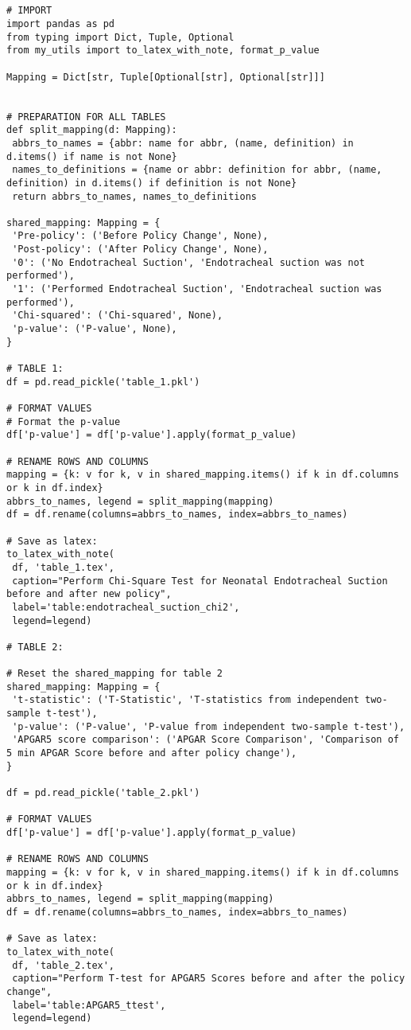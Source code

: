 \documentclass[11pt]{article}
\begin{document}
\begin{verbatim}


# IMPORT
import pandas as pd
from typing import Dict, Tuple, Optional
from my_utils import to_latex_with_note, format_p_value

Mapping = Dict[str, Tuple[Optional[str], Optional[str]]]


# PREPARATION FOR ALL TABLES
def split_mapping(d: Mapping):
 abbrs_to_names = {abbr: name for abbr, (name, definition) in d.items() if name is not None}
 names_to_definitions = {name or abbr: definition for abbr, (name, definition) in d.items() if definition is not None}
 return abbrs_to_names, names_to_definitions

shared_mapping: Mapping = {
 'Pre-policy': ('Before Policy Change', None),
 'Post-policy': ('After Policy Change', None),
 '0': ('No Endotracheal Suction', 'Endotracheal suction was not performed'),
 '1': ('Performed Endotracheal Suction', 'Endotracheal suction was performed'),
 'Chi-squared': ('Chi-squared', None),
 'p-value': ('P-value', None),
}

# TABLE 1:
df = pd.read_pickle('table_1.pkl')

# FORMAT VALUES
# Format the p-value
df['p-value'] = df['p-value'].apply(format_p_value)

# RENAME ROWS AND COLUMNS
mapping = {k: v for k, v in shared_mapping.items() if k in df.columns or k in df.index}
abbrs_to_names, legend = split_mapping(mapping)
df = df.rename(columns=abbrs_to_names, index=abbrs_to_names)

# Save as latex:
to_latex_with_note(
 df, 'table_1.tex',
 caption="Perform Chi-Square Test for Neonatal Endotracheal Suction before and after new policy", 
 label='table:endotracheal_suction_chi2',
 legend=legend)

# TABLE 2:

# Reset the shared_mapping for table 2
shared_mapping: Mapping = {
 't-statistic': ('T-Statistic', 'T-statistics from independent two-sample t-test'),
 'p-value': ('P-value', 'P-value from independent two-sample t-test'),
 'APGAR5 score comparison': ('APGAR Score Comparison', 'Comparison of 5 min APGAR Score before and after policy change'),
}

df = pd.read_pickle('table_2.pkl')

# FORMAT VALUES
df['p-value'] = df['p-value'].apply(format_p_value)

# RENAME ROWS AND COLUMNS
mapping = {k: v for k, v in shared_mapping.items() if k in df.columns or k in df.index}
abbrs_to_names, legend = split_mapping(mapping)
df = df.rename(columns=abbrs_to_names, index=abbrs_to_names)

# Save as latex:
to_latex_with_note(
 df, 'table_2.tex',
 caption="Perform T-test for APGAR5 Scores before and after the policy change", 
 label='table:APGAR5_ttest',
 legend=legend)


\end{verbatim}
\end{document}
